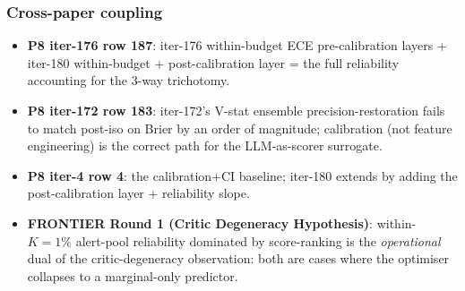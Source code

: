 \subsubsection{Cross-paper coupling}
\begin{itemize}
\item \textbf{P8 iter-176 row 187}: iter-176 within-budget ECE
  pre-calibration layers + iter-180 within-budget + post-calibration
  layer = the full reliability accounting for the 3-way trichotomy.
\item \textbf{P8 iter-172 row 183}: iter-172's V-stat ensemble
  precision-restoration fails to match post-iso on Brier by an
  order of magnitude; calibration (not feature engineering) is the
  correct path for the LLM-as-scorer surrogate.
\item \textbf{P8 iter-4 row 4}: the calibration+CI baseline; iter-180
  extends by adding the post-calibration layer + reliability slope.
\item \textbf{FRONTIER Round 1 (Critic Degeneracy Hypothesis)}:
  within-$K{=}1\%$ alert-pool reliability dominated by score-ranking
  is the \emph{operational} dual of the critic-degeneracy
  observation: both are cases where the optimiser collapses to a
  marginal-only predictor.
\end{itemize}
